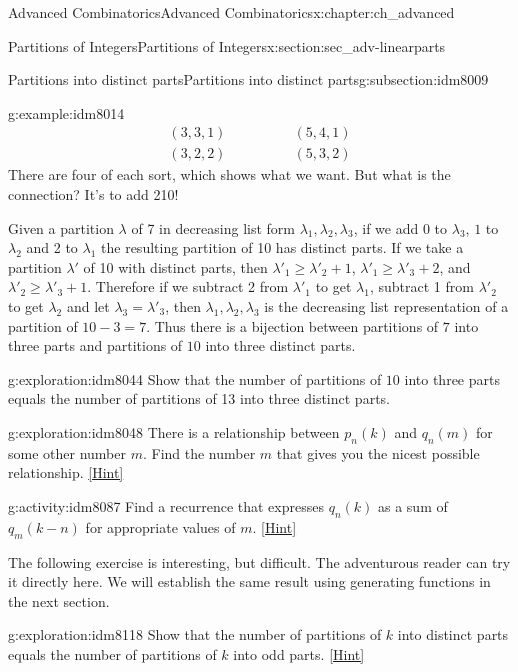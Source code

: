 \documentclass[oneside,10pt,]{book}
\numberwithin{equation}{chapter}
\newcommand{\amp}{&}
\begin{document}
\begin{chapterptx}{Advanced Combinatorics}{}{Advanced Combinatorics}{}{}{x:chapter:ch_advanced}
\begin{sectionptx}{Partitions of Integers}{}{Partitions of Integers}{}{}{x:section:sec_adv-linearparts}
\begin{subsectionptx}{Partitions into distinct parts}{}{Partitions into distinct parts}{}{}{g:subsection:idm8009}
\begin{example}{}{g:example:idm8014}
\begin{align*}
(3,3,1) \qquad \amp \qquad (5,4,1)\\
(3,2,2) \qquad \amp \qquad (5,3,2)
\end{align*}
There are four of each sort, which shows what we want.  But what is the connection?  It's to add 210!%
\par
Given a partition \(\lambda\) of 7 in decreasing list form \(\lambda_1,\lambda_2,\lambda_3\), if we add 0 to \(\lambda_3\), \(1\) to \(\lambda_2\) and 2 to \(\lambda_1\) the resulting partition of 10 has distinct parts. If we take a partition \(\lambda'\) of 10 with distinct parts, then \(\lambda'_1\ge\lambda'_2+1\), \(\lambda'_1\ge\lambda'_3+2\), and \(\lambda'_2\ge \lambda'_3+1\). Therefore if we subtract 2 from \(\lambda'_1\) to get \(\lambda_1\), subtract 1 from \(\lambda'_2\) to get \(\lambda_2\) and let \(\lambda_3= \lambda'_3\), then \(\lambda_1,\lambda_2,\lambda_3\) is the decreasing list representation of a partition of \(10-3=7\). Thus there is a bijection between partitions of \(7\) into three parts and partitions of \(10\) into three distinct parts.%
\end{example}
\begin{exploration}{}{g:exploration:idm8044}%
Show that the number of partitions of \(10\) into three parts equals the number of partitions of 13 into three distinct parts.%
\end{exploration}
\begin{exploration}{}{g:exploration:idm8048}%
There is a relationship between \(p_n(k)\) and \(q_n(m)\) for some other number \(m\). Find the number \(m\) that gives you the nicest possible relationship.%
\space\hspace*{0pt}\hfill{\tiny\hyperlink{g:hint:idm8055-back}{[Hint]}}\end{exploration}
\begin{activity}{}{g:activity:idm8087}%
Find a recurrence that expresses \(q_n(k)\) as a sum of \(q_m(k-n)\) for appropriate values of \(m\).%
\space\hspace*{0pt}\hfill{\tiny\hyperlink{g:hint:idm8093-back}{[Hint]}}\end{activity}
The following exercise is interesting, but difficult.  The adventurous reader can try it directly here.  We will establish the same result using generating functions in the next section.%
\begin{exploration}{}{g:exploration:idm8118}%
Show that the number of partitions of \(k\) into distinct parts equals the number of partitions of \(k\) into odd parts.%
\space\hspace*{0pt}\hfill{\tiny\hyperlink{g:hint:idm8123-back}{[Hint]}}\end{exploration}

\end{subsectionptx}
\end{sectionptx}
\end{chapterptx}
\end{document}
